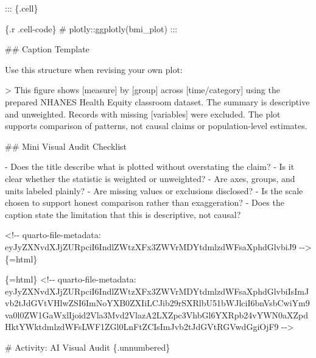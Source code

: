 \documentclass[
  letterpaper,
  DIV=11,
  numbers=noendperiod,
  oneside]{scrreprt}
\newenvironment{Shaded}{\begin{snugshade}}{\end{snugshade}}
\newcommand{\AttributeTok}[1]{\textcolor[rgb]{0.40,0.45,0.13}{#1}}
\newcommand{\CommentTok}[1]{\textcolor[rgb]{0.37,0.37,0.37}{#1}}
\newcommand{\FunctionTok}[1]{\textcolor[rgb]{0.28,0.35,0.67}{#1}}
\newcommand{\InformationTok}[1]{\textcolor[rgb]{0.37,0.37,0.37}{#1}}
\newcommand{\NormalTok}[1]{\textcolor[rgb]{0.00,0.23,0.31}{#1}}
\newcommand{\OtherTok}[1]{\textcolor[rgb]{0.00,0.23,0.31}{#1}}
\newcommand{\SpecialStringTok}[1]{\textcolor[rgb]{0.13,0.47,0.30}{#1}}
\begin{document}
\begin{Shaded}
\begin{Highlighting}[numbers=left,,]
\NormalTok{::: \{.cell\}}

\InformationTok{\textasciigrave{}\textasciigrave{}\textasciigrave{}\{.r .cell{-}code\}}
\CommentTok{\# plotly::ggplotly(bmi\_plot)}
\InformationTok{\textasciigrave{}\textasciigrave{}\textasciigrave{}}
\NormalTok{:::}


\FunctionTok{\#\# Caption Template}

\NormalTok{Use this structure when revising your own plot:}

\AttributeTok{\textgreater{} This figure shows }\CommentTok{[}\OtherTok{measure}\CommentTok{]}\AttributeTok{ by }\CommentTok{[}\OtherTok{group}\CommentTok{]}\AttributeTok{ across }\CommentTok{[}\OtherTok{time/category}\CommentTok{]}\AttributeTok{ using the prepared NHANES Health Equity classroom dataset. The summary is descriptive and unweighted. Records with missing }\CommentTok{[}\OtherTok{variables}\CommentTok{]}\AttributeTok{ were excluded. The plot supports comparison of patterns, not causal claims or population{-}level estimates.}

\FunctionTok{\#\# Mini Visual Audit Checklist}

\SpecialStringTok{{-} }\NormalTok{Does the title describe what is plotted without overstating the claim?}
\SpecialStringTok{{-} }\NormalTok{Is it clear whether the statistic is weighted or unweighted?}
\SpecialStringTok{{-} }\NormalTok{Are axes, groups, and units labeled plainly?}
\SpecialStringTok{{-} }\NormalTok{Are missing values or exclusions disclosed?}
\SpecialStringTok{{-} }\NormalTok{Is the scale chosen to support honest comparison rather than exaggeration?}
\SpecialStringTok{{-} }\NormalTok{Does the caption state the limitation that this is descriptive, not causal?}


\InformationTok{\textasciigrave{}\textless{}!{-}{-} quarto{-}file{-}metadata: eyJyZXNvdXJjZURpciI6IndlZWtzXFx3ZWVrMDYtdmlzdWFsaXphdGlvbiJ9 {-}{-}\textgreater{}\textasciigrave{}}\NormalTok{\{=html\}}

\InformationTok{\textasciigrave{}\textasciigrave{}\textasciigrave{}\{=html\}}
\InformationTok{\textless{}!{-}{-} quarto{-}file{-}metadata: eyJyZXNvdXJjZURpciI6IndlZWtzXFx3ZWVrMDYtdmlzdWFsaXphdGlvbiIsImJvb2tJdGVtVHlwZSI6ImNoYXB0ZXIiLCJib29rSXRlbU51bWJlciI6bnVsbCwiYm9va0l0ZW1GaWxlIjoid2Vla3Mvd2VlazA2LXZpc3VhbGl6YXRpb24vYWN0aXZpdHktYWktdmlzdWFsLWF1ZGl0LnFtZCIsImJvb2tJdGVtRGVwdGgiOjF9 {-}{-}\textgreater{}}
\InformationTok{\textasciigrave{}\textasciigrave{}\textasciigrave{}}

\FunctionTok{\# Activity: AI Visual Audit \{.unnumbered\}}



\end{Highlighting}
\end{Shaded}
\end{document}
